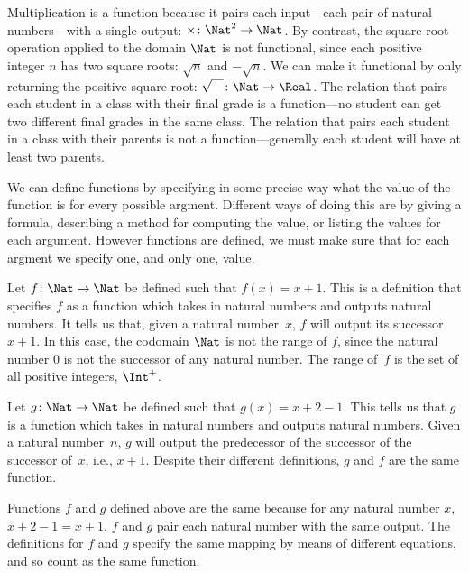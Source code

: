 \documentclass[../../../include/open-logic-section]{subfiles}
\begin{document}
\begin{explain}
Multiplication is a function because it pairs each input---each pair
of natural numbers---with a single output: $\times \colon \Nat^2 \to
\Nat$. By contrast, the square root operation applied to the domain
$\Nat$ is not functional, since each positive integer $n$ has two
square roots: $\sqrt{n}$ and $-\sqrt{n}$. We can make it functional by
only returning the positive square root: $\sqrt{\phantom{X}} \colon
\Nat \to \Real$. The relation that pairs each student in a class with
their final grade is a function---no student can get two different
final grades in the same class. The relation that pairs each student
in a class with their parents is not a function---generally each
student will have at least two parents.

We can define functions by specifying in some precise way what the
value of the function is for every possible argment. Different ways of
doing this are by giving a formula, describing a method for computing
the value, or listing the values for each argument. However functions
are defined, we must make sure that for each argment we specify one,
and only one, value.
\end{explain}


\begin{ex}
Let $f \colon \Nat \to \Nat$ be defined such that $f(x) = x+1$. This
is a definition that specifies $f$ as a function which takes in
natural numbers and outputs natural numbers. It tells us that, given a
natural number~$x$, $f$ will output its successor~$x+1$.
In this case, the codomain $\Nat$ is not the range of $f$, since the
natural number $0$ is not the successor of any natural number. The
range of~$f$ is the set of all positive integers, $\Int^{+}$.
\end{ex}

\begin{ex}
Let $g \colon \Nat \to \Nat$ be defined such that $g(x) = x+2-1$. This
tells us that $g$ is a function which takes in natural numbers and
outputs natural numbers. Given a natural number~$n$, $g$ will output
the predecessor of the successor of the successor of~$x$, i.e.,
$x+1$. Despite their different definitions, $g$ and $f$ are the same
function.
\end{ex}

\begin{explain}
Functions $f$ and $g$ defined above are the same because for any
natural number $x$, $x+2-1 = x+1$. $f$ and $g$ pair each natural
number with the same output. The definitions for $f$ and $g$ specify
the same mapping by means of different equations, and so count as the
same function.
\end{explain}
\end{document}
